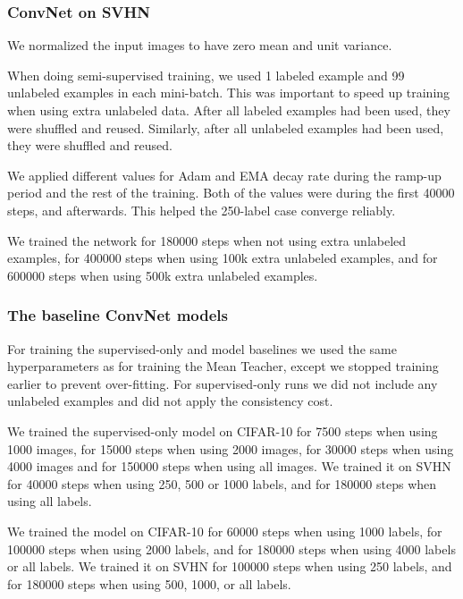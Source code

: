 \documentclass{article}
\begin{document}
\subsubsection{ConvNet on SVHN}
\label{appendix:svhn_description}

We normalized the input images to have zero mean and unit variance.

When doing semi-supervised training, we used 1 labeled example and 99 unlabeled examples in each mini-batch.
This was important to speed up training when using extra unlabeled data.
After all labeled examples had been used, they were shuffled and reused.
Similarly, after all unlabeled examples had been used, they were shuffled and reused.

We applied different values for Adam  and EMA decay rate during the ramp-up period and the rest of the training. 
Both of the values were  during the first 40000 steps, and  afterwards.
This helped the 250-label case converge reliably.

We trained the network for 180000 steps when not using extra unlabeled examples, for 400000 steps when using 100k extra unlabeled examples, and for 600000 steps when using 500k extra unlabeled examples. 

\subsubsection{The baseline ConvNet models}

For training the supervised-only and  model baselines we used the same hyperparameters as for training the Mean Teacher, except we stopped training earlier to prevent over-fitting.
For supervised-only runs we did not include any unlabeled examples and did not apply the consistency cost.

We trained the supervised-only model on CIFAR-10 for 7500 steps when using 1000 images, for 15000 steps when using 2000 images, for 30000 steps when using 4000 images and for 150000 steps when using all images.
We trained it on SVHN for 40000 steps when using 250, 500 or 1000 labels, and for 180000 steps when using all labels.

We trained the  model on CIFAR-10 for 60000 steps when using 1000 labels, for 100000 steps when using 2000 labels, and for 180000 steps when using 4000 labels or all labels.
We trained it on SVHN for 100000 steps when using 250 labels, and for 180000 steps when using 500, 1000, or all labels.
\end{document}
